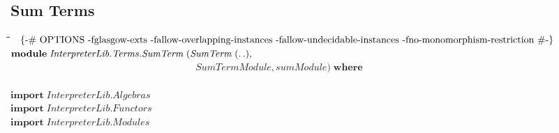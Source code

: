 \documentclass[10pt]{article}
\newlength{\lwidth}\setlength{\lwidth}{4.5cm}
\newlength{\cwidth}\setlength{\cwidth}{8mm} %
\newcommand{\Conid}[1]{\mathit{#1}}
\newcommand{\Varid}[1]{\mathit{#1}}
\begin{document}
\subsection{Sum Terms}
\begin{tabbing}
\qquad\=\hspace{\lwidth}\=\hspace{\cwidth}\=\+\kill
${\mbox{\enskip\{-\# OPTIONS -fglasgow-exts -fallow-overlapping-instances -fallow-undecidable-instances -fno-monomorphism-restriction  \#-\}\enskip}}$\\
${\mathbf{module}\;\Conid{\Conid{InterpreterLib}.\Conid{Terms}.SumTerm}\;(\Conid{SumTerm}\;(\mathinner{\ldotp\ldotp}),}$\\
${\phantom{\mathbf{module}\;\Conid{\Conid{InterpreterLib}.\Conid{Terms}.SumTerm}\;(\mbox{}}\Conid{SumTermModule},\Varid{sumModule})\;\mathbf{where}}$\\
${}$\\
${\mathbf{import}\;\Conid{\Conid{InterpreterLib}.Algebras}}$\\
${\mathbf{import}\;\Conid{\Conid{InterpreterLib}.Functors}}$\\
${\mathbf{import}\;\Conid{\Conid{InterpreterLib}.Modules}}$
\end{tabbing}
\end{document}
